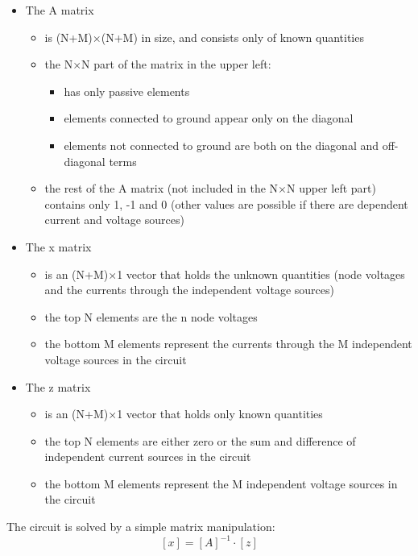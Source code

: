 \documentclass[10pt]{report}
\begin{document}
\begin{itemize}

\item The A matrix
\begin{itemize}
\item
is (N+M)$\times$(N+M) in size, and consists only of known quantities
\item
the N$\times$N part of the matrix in the upper left:
\begin{itemize}
\item
has only passive elements
\item
elements connected to ground appear only on the diagonal
\item
elements not connected to ground are both on the diagonal and
off-diagonal terms
\end{itemize}
\item
the rest of the A matrix (not included in the N$\times$N upper left
part) contains only 1, -1 and 0 (other values are possible if there
are dependent current and voltage sources)
\end{itemize}

\item The x matrix
\begin{itemize}
\item
is an (N+M)$\times$1 vector that holds the unknown quantities (node
voltages and the currents through the independent voltage sources)
\item
the top N elements are the n node voltages
\item
the bottom M elements represent the currents through the M independent
voltage sources in the circuit
\end{itemize}

\item The z matrix
\begin{itemize}
\item
is an (N+M)$\times$1 vector that holds only known quantities
\item
the top N elements are either zero or the sum and difference of
independent current sources in the circuit
\item
the bottom M elements represent the M independent voltage sources in
the circuit
\end{itemize}
\end{itemize}

The circuit is solved by a simple matrix manipulation:
\begin{equation}
\left[x\right] = \left[A\right]^{-1} \cdot \left[z\right]
\end{equation}
\end{document}
